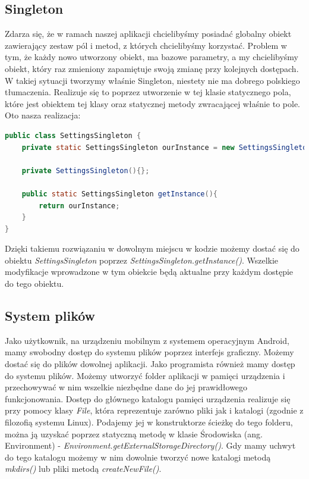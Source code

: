 \documentclass{article}
\numberwithin{equation}{section}
\begin{document}
\subsection{Singleton}
Zdarza się, że w ramach naszej aplikacji chcielibyśmy posiadać globalny obiekt zawierający zestaw pól i metod, z których chcielibyśmy korzystać. Problem w tym, że każdy nowo utworzony obiekt, ma bazowe parametry, a my chcielibyśmy obiekt, który raz zmieniony zapamiętuje swoją zmianę przy kolejnych dostępach. W takiej sytuacji tworzymy właśnie Singleton, niestety nie ma dobrego polskiego tłumaczenia. Realizuje się to poprzez utworzenie w tej klasie statycznego pola, które jest obiektem tej klasy oraz statycznej metody zwracającej właśnie to pole. Oto nasza realizacja:
\begin{lstlisting}[language=Java]
public class SettingsSingleton {
    private static SettingsSingleton ourInstance = new SettingsSingleton();
    
    private SettingsSingleton(){};
    
    public static SettingsSingleton getInstance(){
        return ourInstance;
    }
}
\end{lstlisting}
Dzięki takiemu rozwiązaniu w dowolnym miejscu w kodzie możemy dostać się do obiektu \textit{SettingsSingleton} poprzez \textit{SettingsSingleton.getInstance()}. Wszelkie modyfikacje wprowadzone w tym obiekcie będą aktualne przy każdym dostępie do tego obiektu.
\subsection{System plików}
Jako użytkownik, na urządzeniu mobilnym z systemem operacyjnym Android, mamy swobodny dostęp do systemu plików poprzez interfejs graficzny. Możemy dostać się do plików dowolnej aplikacji. Jako programista również mamy dostęp do systemu plików. Możemy utworzyć folder aplikacji w pamięci urządzenia i przechowywać w nim wszelkie niezbędne dane do jej prawidłowego funkcjonowania. Dostęp do głównego katalogu pamięci urządzenia realizuje się przy pomocy klasy \textit{File}, która reprezentuje zarówno pliki jak i katalogi (zgodnie z filozofią systemu Linux). Podajemy jej w konstruktorze ścieżkę do tego folderu, można ją uzyskać poprzez statyczną metodę w klasie Środowiska (ang. Environment) -  \textit{Environment.getExternalStorageDirectory()}. Gdy mamy uchwyt do tego katalogu możemy w nim dowolnie tworzyć nowe katalogi metodą \textit{mkdirs()} lub pliki metodą \textit{createNewFile()}.
\end{document}
